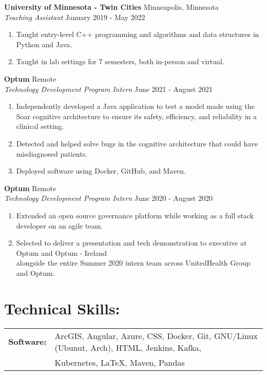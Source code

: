 \documentclass[10pt]{article}
\begin{document}
		\noindent
		\textbf{University of Minnesota - Twin Cities} \hfill Minneapolis, Minnesota \\
		\textit{Teaching Assistant} \hfill January 2019 - May 2022 
		\begin{enumerate}[label=--]
			\item Taught entry-level C++ programming and algorithms and data structures in Python and Java.
			\item Taught in lab settings for 7 semesters, both in-person and virtual.
		\end{enumerate}
		
		\noindent
		\textbf{Optum} \hfill Remote \\
		\textit{Technology Development Program Intern} \hfill June 2021 - August 2021
		\begin{enumerate}[label=--]
			\item Independently developed a Java application to test a model made using the Soar cognitive architecture to ensure its safety, efficiency, and reliability in a clinical setting.
			\item Detected and helped solve bugs in the cognitive architecture that could have misdiagnosed patients.
			\item Deployed software using Docker, GitHub, and Maven.
		\end{enumerate}		
		
		\noindent
		\textbf{Optum} \hfill Remote \\
		\textit{Technology Development Program Intern} \hfill June 2020 - August 2020
		\begin{enumerate}[label=--]
			\item Extended an open source governance platform while working as a full stack developer on an agile team.
			\item Selected to deliver a presentation and tech demonstration to executive at Optum and Optum - Ireland \\ alongside the entire Summer 2020 intern team across UnitedHealth Group and Optum.
		\end{enumerate}
		
	\section*{Technical Skills: \hrulefill}
		\begin{tabular}{@{}l@{\ }l}
		\textbf{Software: } & ArcGIS, Angular, Azure, CSS, Docker, Git, GNU/Linux (Ubunut, Arch), HTML, Jenkins, Kafka, \\ & Kubernetes, \LaTeX, Maven, Pandas
		\end{tabular}
		
\end{document}
